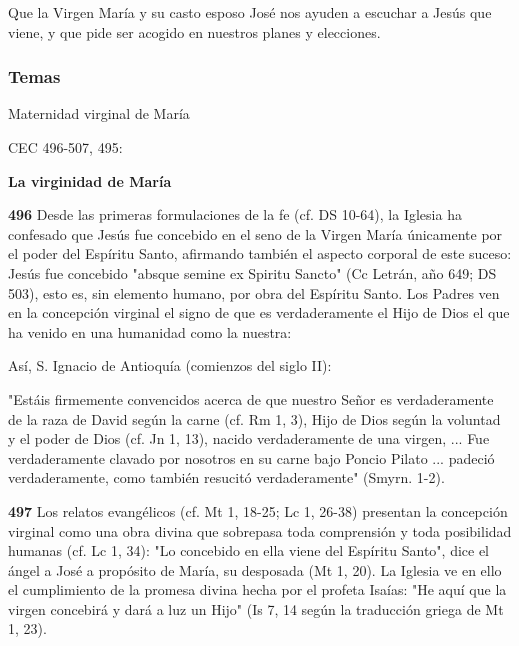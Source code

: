 \documentclass[]{article}
\begin{document}
Que la Virgen María y su casto esposo José nos ayuden a escuchar a Jesús
que viene, y que pide ser acogido en nuestros planes y
elecciones.\protect\hypertarget{_Toc448662767}{}{\protect\hypertarget{_Toc448690286}{}{}}

\subsubsection{Temas}\label{temas-3}

Maternidad virginal de María

CEC 496-507, 495:

\textbf{La virginidad de María}

\textbf{496} Desde las primeras formulaciones de la fe (cf. DS 10-64),
la Iglesia ha confesado que Jesús fue concebido en el seno de la Virgen
María únicamente por el poder del Espíritu Santo, afirmando también el
aspecto corporal de este suceso: Jesús fue concebido "absque semine ex
Spiritu Sancto" (Cc Letrán, año 649; DS 503), esto es, sin elemento
humano, por obra del Espíritu Santo. Los Padres ven en la concepción
virginal el signo de que es verdaderamente el Hijo de Dios el que ha
venido en una humanidad como la nuestra:

Así, S. Ignacio de Antioquía (comienzos del siglo II):

"Estáis firmemente convencidos acerca de que nuestro Señor es
verdaderamente de la raza de David según la carne (cf. Rm 1, 3), Hijo de
Dios según la voluntad y el poder de Dios (cf. Jn 1, 13), nacido
verdaderamente de una virgen, ... Fue verdaderamente clavado por
nosotros en su carne bajo Poncio Pilato ... padeció verdaderamente, como
también resucitó verdaderamente" (Smyrn. 1-2).

\textbf{497} Los relatos evangélicos (cf. Mt 1, 18-25; Lc 1, 26-38)
presentan la concepción virginal como una obra divina que sobrepasa toda
comprensión y toda posibilidad humanas (cf. Lc 1, 34): "Lo concebido en
ella viene del Espíritu Santo", dice el ángel a José a propósito de
María, su desposada (Mt 1, 20). La Iglesia ve en ello el cumplimiento de
la promesa divina hecha por el profeta Isaías: "He aquí que la virgen
concebirá y dará a luz un Hijo" (Is 7, 14 según la traducción griega de
Mt 1, 23).
\end{document}
